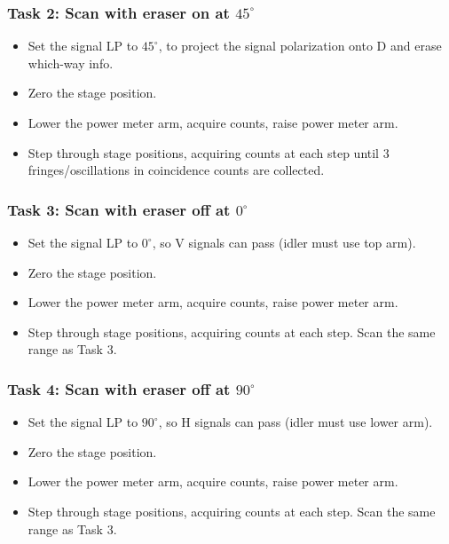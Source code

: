 \documentclass{article}
\begin{document}
\subsubsection*{Task 2: Scan with eraser on at $45^\circ$}

\begin{itemize}
\item Set the signal LP to $45^\circ$, to project the signal polarization onto D and erase which-way info.
\item Zero the stage position.
\item Lower the power meter arm, acquire counts, raise power meter arm.  
\item Step through stage positions, acquiring counts at each step until 3 fringes/oscillations in coincidence counts are collected.
\end{itemize}

\subsubsection*{Task 3: Scan with eraser off at $0^\circ$}

\begin{itemize}
\item Set the signal LP to $0^\circ$, so V signals can pass (idler must use top arm).
\item Zero the stage position.
\item Lower the power meter arm, acquire counts, raise power meter arm.  
\item Step through stage positions, acquiring counts at each step. Scan the same range as Task 3.
\end{itemize}

\subsubsection*{Task 4: Scan with eraser off at $90^\circ$}

\begin{itemize}
\item Set the signal LP to $90^\circ$, so H signals can pass (idler must use lower arm).
\item Zero the stage position.
\item Lower the power meter arm, acquire counts, raise power meter arm.  
\item Step through stage positions, acquiring counts at each step. Scan the same range as Task 3.
\end{itemize}
\end{document}
